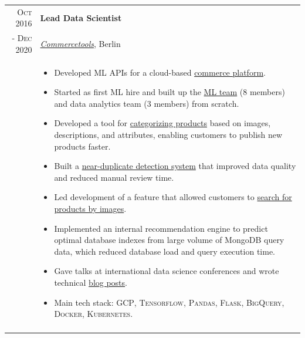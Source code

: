 \documentclass[a4paper,10pt]{article}
\begin{document}
\begin{tabular}{r|p{14.5cm}}
 \textsc{Oct 2016} & 
 \textbf{Lead Data Scientist} \\ 
 \textsc{- Dec 2020} & 
 \emph{\href{https://commercetools.com/}{Commercetools}}, Berlin \\[-1.5mm]
 & \small\begin{itemize}[leftmargin=1em, itemsep=0.5mm, parsep=0mm]
   \item Developed ML APIs for a cloud-based \href{https://docs.commercetools.com}{commerce platform}.
   \item Started as first ML hire and built up the \href{https://techblog.commercetools.com/building-up-a-data-science-team-from-scratch-7a7b24ba9f2d}{ML team} (8 members) and data analytics team (3 members) from scratch.
   \item Developed a tool for \href{https://techblog.commercetools.com/boosting-product-categorization-with-machine-learning-ad4dbd30b0e8}{categorizing products} based on images, descriptions, and attributes, enabling customers to publish new products faster.
   \item Built a \href{https://medium.com/@Evi.lazaridou/improving-data-quality-with-product-similarity-search-d037c7212071}{near-duplicate detection system} that improved data quality and reduced manual review time.
   \item Led development of a feature that allowed customers to \href{https://medium.com/@mnalavadi/reverse-image-search-with-machine-learning-92786a07c142}{search for products by images}.
   \item Implemented an internal recommendation engine to predict optimal database indexes from large volume of MongoDB query data, which reduced database load and query execution time.
   \item Gave talks at international data science conferences and wrote technical \href{https://medium.com/@amadeus.magrabi}{blog posts}.
   \item Main tech stack: \textsc{GCP}, \textsc{Tensorflow}, \textsc{Pandas}, \textsc{Flask}, \textsc{BigQuery}, \textsc{Docker}, \textsc{Kubernetes}.
   \end{itemize} \\
   \multicolumn{2}{c}{} \\


\end{tabular}
\end{document}
